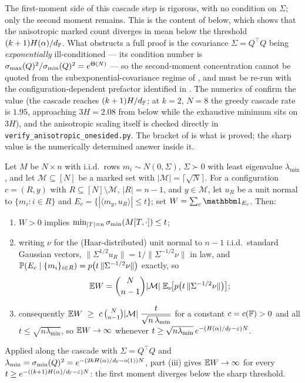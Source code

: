 \begin{remark}[Achievability of $(k+1)H/\dF$]
The first-moment side of this cascade step is rigorous, with no condition on $\Sigma$; only the
second moment remains. This is the content of  below, which shows that the
anisotropic marked count diverges in mean below the threshold $(k+1)H(\alpha)/d_{\mathbb{F}}$. What obstructs a
full proof is the covariance $\Sigma=Q^\top Q$ being \emph{exponentially} ill-conditioned --- its
condition number is $\sigma_{\max}(Q)^2/\sigma_{\min}(Q)^2=e^{\Theta(N)}$ --- so the second-moment concentration cannot
be quoted from the subexponential-covariance regime of \cite{shmaloBAMS}, and must be re-run with the
configuration-dependent prefactor identified in . The numerics of
 confirm the value (the cascade reaches $(k+1)H/\dF$; at $k=2$, $N=8$ the greedy
cascade rate is $1.95$, approaching $3H=2.08$ from below while the exhaustive minimum sits on $3H$), and
the anisotropic scaling itself is checked directly in \texttt{verify\_anisotropic\_onesided.py}. The
bracket of  is what is proved; the sharp value is the numerically determined answer
inside it.
\end{remark}

\begin{proposition}\label{prop:aniso-mean}
Let $M$ be $N\times n$ with i.i.d.\ rows $m_i\sim N(0,\Sigma)$, $\Sigma\succ0$ with least eigenvalue
$\lambda_{\min}$, and let $\mathcal M\subseteq[N]$ be a marked set with $|\mathcal M|=\lceil\sqrt N\rceil$.
For a configuration $c=(R,y)$ with $R\subseteq[N]\setminus\mathcal M$, $|R|=n-1$, and $y\in\mathcal M$, let
$u_R$ be a unit normal to $\{m_i:i\in R\}$ and $E_c=\{|\langle m_y,u_R\rangle|\le t\}$; set
$W=\sum_c\one_{E_c}$. Then:
\begin{enumerate}
\item[(i)] $W>0$ implies $\min_{|T|=n}\sigma_{\min}(M[T,\cdot])\le t$;
\item[(ii)] writing $\nu$ for the (Haar-distributed) unit normal to $n-1$ i.i.d.\ standard Gaussian
vectors, $\|\Sigma^{1/2}u_R\|=1/\|\Sigma^{-1/2}\nu\|$ in law, and $\mathbb{P}(E_c\mid\{m_i\}_{i\in R})=p\bigl(t\,\|\Sigma^{-1/2}\nu\|\bigr)$
exactly, so
\[
  \mathbb{E} W=\binom{N}{n-1}|\mathcal M|\;\mathbb{E}_\nu\!\bigl[p\bigl(t\,\|\Sigma^{-1/2}\nu\|\bigr)\bigr];
\]
\item[(iii)] consequently $\EE W\ \ge\ c\,\binom{N}{n-1}|\mathcal M|\;\dfrac{t}{\sqrt{n\,\lambda_{\min}}}$
for a constant $c=c(\mathbb{F})>0$ and all $t\le\sqrt{n\lambda_{\min}}$, so $\mathbb{E} W\to\infty$ whenever
$t\ge\sqrt{n\lambda_{\min}}\,e^{-(H(\alpha)/d_{\mathbb{F}}-\varepsilon)N}$.
\end{enumerate}
Applied along the cascade with $\Sigma=Q^\top Q$ and $\lambda_{\min}=\sigma_{\min}(Q)^2=e^{-(2kH(\alpha)/d_{\mathbb{F}}-o(1))N}$,
part (iii) gives $\mathbb{E} W\to\infty$ for every $t\ge e^{-((k+1)H(\alpha)/d_{\mathbb{F}}-\varepsilon)N}$: the first moment
diverges below the sharp threshold.
\end{proposition}

